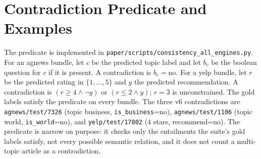 \documentclass[11pt]{article}
\begin{document}


\section{Contradiction Predicate and Examples}
\label{app:predicate}

The predicate is implemented in \texttt{paper/scripts/consistency\_all\_engines.py}. For an agnews bundle, let $c$ be the predicted topic label and let $b_c$ be the boolean question for $c$ if it is present. A contradiction is $b_c=\text{no}$. For a yelp bundle, let $r$ be the predicted rating in $\{1,\dots,5\}$ and $y$ the predicted recommendation. A contradiction is $(r\ge4 \land \neg y)$ or $(r\le2 \land y)$; $r=3$ is unconstrained. The gold labels satisfy the predicate on every bundle. The three v6 contradictions are \texttt{agnews/test/7326} (topic business, \texttt{is\_business}=no), \texttt{agnews/test/1106} (topic world, \texttt{is\_world}=no), and \texttt{yelp/test/17802} (4 stars, recommend=no). The predicate is narrow on purpose: it checks only the entailments the suite's gold labels satisfy, not every possible semantic relation, and it does not count a multi-topic article as a contradiction.
\end{document}
